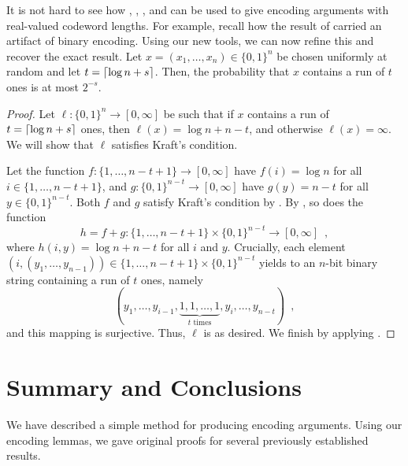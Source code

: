 \documentclass[format=acmsmall, review=false, screen=true]{acmart}
\newenvironment{customthm}[1]
  {\renewcommand\theinnercustomthm{#1}\innercustomthm}
  {\endinnercustomthm}
\begin{document}
It is not hard to see how , ,
, and  can be used to
give encoding arguments with real-valued codeword lengths. For
example, recall how the result of  carried an artifact
of binary encoding. Using our new tools, we can now refine this and
recover the exact result.
\begin{customthm}{\ref*{thm:runs-i}b}
  Let $x=(x_1,\ldots,x_n)\in\{0,1\}^n$ be chosen uniformly at random
  and let $t = {\lceil \log n + s \rceil}$. Then, the probability that 
   $x$ contains
  a run of $t$ ones
  is at most $2^{-s}$.
\end{customthm}
\begin{proof}
  Let $\ell : \{0, 1\}^n \to [0, \infty]$ be such that if $x$ contains
  a run of $t = {\lceil \log n + s \rceil}$ ones, then
  $\ell(x) = \log n + n - t$, and otherwise $\ell(x) = \infty$. We
  will show that $\ell$ satisfies Kraft's condition.


  Let the function $f : \{1, \ldots, n - t + 1\} \to [0, \infty]$ have
  $f(i) = \log n$ for all $i \in \{1, \dots, n - t + 1\}$, and
  $g : \{0, 1\}^{n - t} \to [0, \infty]$ have $g(y) = n - t$ for all
  $y \in \{0, 1\}^{n - t}$. Both $f$ and $g$ satisfy Kraft's condition by
  . By , so does
  the function
  \[
    h = f + g : \{1, \ldots, n - t + 1\} \times \{0, 1\}^{n - t} \to
    [0, \infty] \enspace ,
  \]
  where $h(i, y) = \log n + n - t$ for all $i$ and $y$. Crucially,
  each element $(i, (y_1, \dots, y_{n-1})) \in 
  \{1, \ldots, n - t + 1\} \times \{0, 1\}^{n
    - t}$ yields to an $n$-bit binary string containing a run of
  $t$ ones, namely 
  \[
  (y_1, \dots, y_{i - 1}, \underbrace{1, 1, \dots, 1}_{\text{$t$ times}},
  y_i, \dots, y_{n - t}) \enspace ,
  \]
  and this mapping is surjective. Thus, $\ell$ is as desired.
  We finish by applying .
\end{proof}

\section{Summary and Conclusions}

We have described a simple method for producing encoding
arguments. Using our encoding lemmas, we gave original proofs for
several previously established results.
\end{document}
